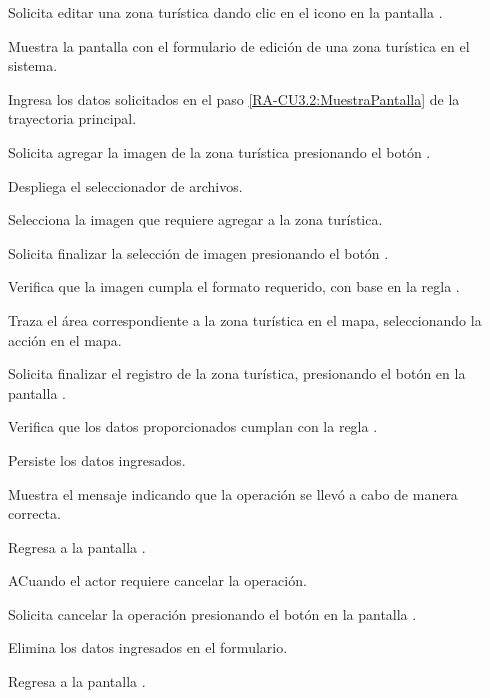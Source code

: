 	\begin{UCtrayectoria} 
		\UCpaso [\UCactor] Solicita editar una zona turística dando clic en el icono \IUEditar{} en la pantalla .
		
		\UCpaso \label{RA-CU3.2:MuestraPantalla} Muestra la pantalla  con el formulario de edición de una zona turística en el sistema.
		
		\UCpaso [\UCactor] \label{RA-CU3.2:IngresaDatos} Ingresa los datos solicitados en el paso \ref{RA-CU3.2:MuestraPantalla} de la trayectoria principal.
		
		\UCpaso [\UCactor] Solicita agregar la imagen de la zona turística presionando el botón .
		
		\UCpaso  Despliega el seleccionador de archivos.
		
		\UCpaso [\UCactor] \label{RA-CU3.2:SeleccionImagen} Selecciona la imagen que requiere agregar a la zona turística.
		
		\UCpaso [\UCactor] Solicita finalizar la selección de imagen presionando el botón .
		
		\UCpaso Verifica que la imagen cumpla el formato requerido, con base en la regla . 
		
		\UCpaso [\UCactor] Traza el área correspondiente a la zona turística en el mapa, seleccionando la acción \IUTrazar{} en el mapa.
		
		\UCpaso [\UCactor] Solicita finalizar el registro de la zona turística, presionando el botón  en la pantalla . 
		
		\UCpaso Verifica que los datos proporcionados cumplan con la regla . 
		
		\UCpaso Persiste los datos ingresados. 
		
		\UCpaso Muestra el mensaje  indicando que la operación se llevó a cabo de manera correcta.
		
		\UCpaso Regresa a la pantalla .
		
	\end{UCtrayectoria}

	\begin{UCtrayectoriaA}{A}{Cuando el actor requiere cancelar la operación.}
		
		\UCpaso [\UCactor] Solicita cancelar la operación presionando el botón  en la pantalla .
		
		\UCpaso Elimina los datos ingresados en el formulario.
		
		\UCpaso Regresa a la pantalla .
	\end{UCtrayectoriaA}